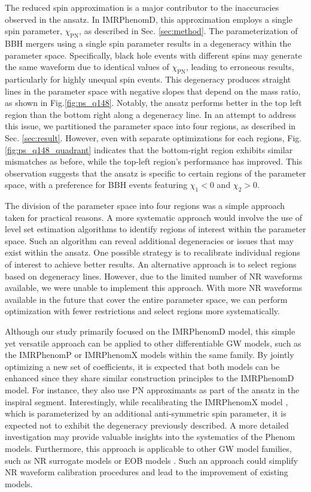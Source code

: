 \documentclass[twocolumn]{aastex631}
\begin{document}
The reduced spin approximation is a major contributor to the inaccuracies
observed in the ansatz. In IMRPhenomD, this approximation employs a single spin
parameter, $\chi_{\mathrm{PN}}$, as described in Sec. \ref{sec:method}. The
parameterization of BBH mergers using a single spin parameter results in a
degeneracy within the parameter space. Specifically, black hole events with
different spins may generate the same waveform due to identical values of
$\chi_{\mathrm{PN}}$, leading to erroneous results, particularly for highly
unequal spin events. This degeneracy produces straight lines in the parameter
space with negative slopes that depend on the mass ratio, as shown in
Fig.\ref{fig:ps_q148}. Notably, the ansatz performs better in the top left
region than the bottom right along a degeneracy line. In an attempt to address
this issue, we partitioned the parameter space into four regions, as described
in Sec. \ref{sec:result}. However, even with separate optimizations for each
regions, Fig.\ref{fig:ps_q148_quadrant} indicates that the bottom-right region
exhibits similar mismatches as before, while the top-left region's performance
has improved. This observation suggests that the ansatz is specific to certain
regions of the parameter space, with a preference for BBH events featuring
$\chi_1<0$ and $\chi_2>0$.

The division of the parameter space into four regions was a simple approach
taken for practical reasons. A more systematic approach would involve the use of
level set estimation algorithms to identify regions of interest within the
parameter space. Such an algorithm can reveal additional degeneracies or issues
that may exist within the ansatz. One possible strategy is to recalibrate
individual regions of interest to achieve better results. An alternative
approach is to select regions based on degeneracy lines. However, due to the
limited number of NR waveforms available, we were unable to implement this
approach. With more NR waveforms available in the future that cover the entire
parameter space, we can perform optimization with fewer restrictions and select
regions more systematically.

Although our study primarily focused on the IMRPhenomD model, this simple yet
versatile approach can be applied to other differentiable GW models, such as the
IMRPhenomP \citep{hannam2014simple} or IMRPhenomX \citep{pratten2020setting} 
models within the same family. By jointly optimizing a new set of coefficients,
it is expected that both models can be enhanced since they share similar
construction principles to the IMRPhenomD model. For instance, they also use PN
approximants as part of the ansatz in the inspiral segment. Interestingly, while
recalibrating the IMRPhenomX model \citep{pratten2020setting}, which is
parameterized by an additional anti-symmetric spin parameter, it is expected not
to exhibit the degeneracy previously described. A more detailed investigation
may provide valuable insights into the systematics of the Phenom models.
Furthermore, this approach is applicable to other GW model families, such as NR
surrogate models \citep{varma2019surrogate} or EOB models
\citep{taracchini2014effective}. Such an approach could simplify NR waveform
calibration procedures and lead to the improvement of existing models.
\end{document}
